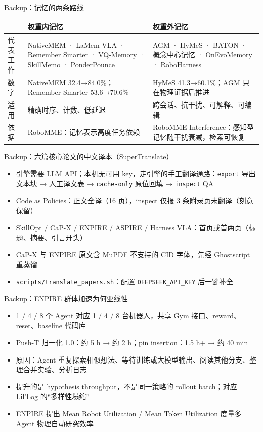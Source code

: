 \documentclass[aspectratio=169,10pt]{beamer}
\begin{document}
\begin{frame}{Backup：记忆的两条路线}
\begin{center}
\small
\begin{tabular}{@{}p{2.6cm}p{4.8cm}p{5.0cm}@{}}
\toprule
& 权重内记忆 & 权重外记忆 \\
\midrule
代表工作 & NativeMEM · LaMem-VLA · Remember Smarter · VQ-Memory · SkillMemo · PonderPounce & AGM · HyMeS · BATON · 概念中心记忆 · OnEvoMemory · RoboHarness \\
数字 & NativeMEM 32.4→84.0\%；Remember Smarter 53.6→70.6\% & HyMeS 41.3→60.1\%；AGM 只在物理证据后推进 \\
适用 & 精确时序、计数、低延迟 & 跨会话、抗干扰、可解释、可编辑 \\
依据 & RoboMME：记忆表示高度任务依赖 & RoboMME-Interference：感知型记忆随干扰衰减，检索可恢复 \\
\bottomrule
\end{tabular}
\end{center}
\end{frame}

\begin{frame}{Backup：六篇核心论文的中文译本（SuperTranslate）}
\begin{itemize}
  \item 引擎需要 LLM API；本机无可用 key，走引擎的手工翻译通路：\texttt{export} 导出文本块 → 人工译文表 → \texttt{cache-only} 原位回填 → \texttt{inspect} QA
  \item Code as Policies：正文全译（16 页），inspect 仅报 3 条附录页未翻译（刻意保留）
  \item SkillOpt / CaP-X / ENPIRE / ASPIRE / Harness VLA：首页或首两页（标题、摘要、引言开头）
  \item CaP-X 与 ENPIRE 原文含 MuPDF 不支持的 CID 字体，先经 Ghostscript 重蒸馏
  \item \texttt{scripts/translate\_papers.sh}：配置 \texttt{DEEPSEEK\_API\_KEY} 后一键补全
\end{itemize}
\end{frame}

\begin{frame}{Backup：ENPIRE 群体加速为何亚线性}
\begin{itemize}
  \item 1 / 4 / 8 个 Agent 对应 1 / 4 / 8 台机器人，共享 Gym 接口、reward、reset、baseline 代码库
  \item Push-T 归一化 1.0：约 5 h → 约 2 h；pin insertion：1.5 h+ → 约 40 min
  \item 原因：Agent 重复探索相似想法、等待训练或大模型输出、阅读其他分支、整理合并实验、分析日志
  \item 提升的是 hypothesis throughput，不是同一策略的 rollout batch；对应 Lil'Log 的“多样性塌缩”
  \item ENPIRE 提出 Mean Robot Utilization / Mean Token Utilization 度量多 Agent 物理自动研究效率
\end{itemize}
\end{frame}
\end{document}
